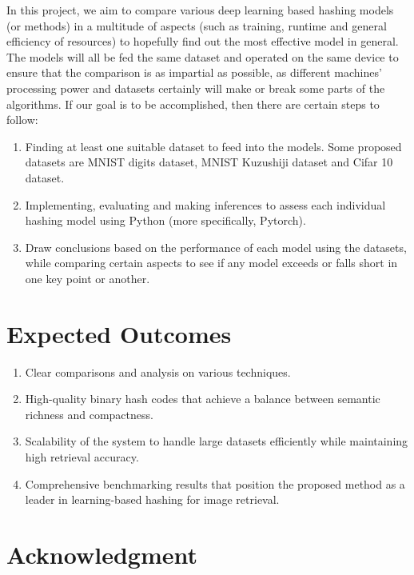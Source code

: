 \documentclass[conference]{IEEEtran}
\begin{document}
In this project, we aim to compare various deep learning based hashing models (or methods) in a multitude of aspects (such as training, runtime and general efficiency of resources) to hopefully find out the most effective model in general.
The models will all be fed the same dataset and operated on the same device to ensure that the comparison is as impartial as possible, as different machines’ processing power and datasets certainly will make or break some parts of the algorithms.
If our goal is to be accomplished, then there are certain steps to follow:
\begin{enumerate}
    \item Finding at least one suitable dataset to feed into the models. Some proposed datasets are MNIST digits dataset, MNIST Kuzushiji dataset and Cifar 10 dataset.
    \item Implementing, evaluating and making inferences to assess each individual hashing model using Python (more specifically, Pytorch).
    \item Draw conclusions based on the performance of each model using the datasets, while comparing certain aspects to see if any model exceeds or falls short in one key point or another.
    
\end{enumerate}

\section{Expected Outcomes}

\begin{enumerate}
    \item Clear comparisons and analysis on various techniques.
    \item High-quality binary hash codes that achieve a balance between semantic richness and compactness.
    \item Scalability of the system to handle large datasets efficiently while maintaining high retrieval accuracy.
    \item Comprehensive benchmarking results that position the proposed method as a leader in learning-based hashing for image retrieval.
    
\end{enumerate}
\section*{Acknowledgment}




\end{document}
